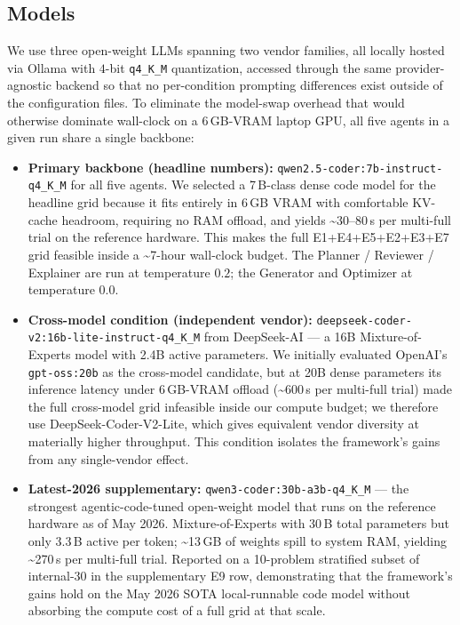 \documentclass[journal]{IEEEtran}
\begin{document}
\subsection{Models}\label{sec:models}
We use three open-weight LLMs spanning two vendor families, all locally hosted via Ollama \cite{ollama} with $4$-bit \texttt{q4\_K\_M} quantization, accessed through the same provider-agnostic backend so that no per-condition prompting differences exist outside of the configuration files. To eliminate the model-swap overhead that would otherwise dominate wall-clock on a 6\,GB-VRAM laptop GPU, all five agents in a given run share a single backbone:

\begin{itemize}
  \item \textbf{Primary backbone (headline numbers):} \texttt{qwen2.5-coder:7b-instruct-q4\_K\_M} \cite{hui2024qwen25coder} for all five agents. We selected a 7\,B-class dense code model for the headline grid because it fits entirely in 6\,GB VRAM with comfortable KV-cache headroom, requiring no RAM offload, and yields \textasciitilde30--80\,s per multi-full trial on the reference hardware. This makes the full E1+E4+E5+E2+E3+E7 grid feasible inside a \textasciitilde7-hour wall-clock budget. The Planner / Reviewer / Explainer are run at temperature $0.2$; the Generator and Optimizer at temperature $0.0$.
  \item \textbf{Cross-model condition (independent vendor):} \nolinkurl{deepseek-coder-v2:16b-lite-instruct-q4_K_M} \cite{deepseekv2coder} from DeepSeek-AI --- a 16B Mixture-of-Experts model with 2.4B active parameters. We initially evaluated OpenAI's \texttt{gpt-oss:20b} \cite{gptoss} as the cross-model candidate, but at 20B dense parameters its inference latency under 6\,GB-VRAM offload (\textasciitilde600\,s per multi-full trial) made the full cross-model grid infeasible inside our compute budget; we therefore use DeepSeek-Coder-V2-Lite, which gives equivalent vendor diversity at materially higher throughput. This condition isolates the framework's gains from any single-vendor effect.
  \item \textbf{Latest-2026 supplementary:} \texttt{qwen3-coder:30b-a3b-q4\_K\_M} \cite{qwen3coder} --- the strongest agentic-code-tuned open-weight model that runs on the reference hardware as of May 2026. Mixture-of-Experts with 30\,B total parameters but only 3.3\,B active per token; \textasciitilde13\,GB of weights spill to system RAM, yielding \textasciitilde270\,s per multi-full trial. Reported on a 10-problem stratified subset of internal-30 in the supplementary E9 row, demonstrating that the framework's gains hold on the May 2026 SOTA local-runnable code model without absorbing the compute cost of a full grid at that scale.
\end{itemize}
\end{document}
